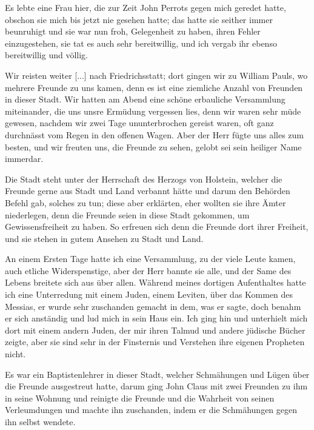 Es lebte eine Frau hier, die zur Zeit John Perrots gegen
mich geredet hatte, obschon sie mich bis jetzt nie gesehen hatte;
das hatte sie seither immer beunruhigt und sie war nun froh,
Gelegenheit zu haben, ihren Fehler einzugestehen, sie tat es auch
sehr bereitwillig, und ich vergab ihr ebenso bereitwillig und
völlig.

Wir reisten weiter [...] nach Friedrichsstatt; dort gingen
wir zu William Pauls, wo mehrere Freunde zu uns kamen,
denn es ist eine ziemliche Anzahl von Freunden in dieser Stadt.
Wir hatten am Abend eine schöne erbauliche Versammlung miteinander, 
die uns unsre Ermüdung vergessen lies, denn wir waren
sehr müde gewesen, nachdem wir zwei Tage ununterbrochen gereist 
waren, oft ganz durchnässt vom Regen in den offenen
Wagen. Aber der Herr fügte uns alles zum besten, und wir
freuten uns, die Freunde zu sehen, gelobt sei sein heiliger Name
immerdar.

Die Stadt steht unter der Herrschaft des Herzogs von 
Holstein, 
welcher die Freunde gerne aus Stadt und Land verbannt
hätte und darum den Behörden Befehl gab, solches zu tun; diese
aber erklärten, eher wollten sie ihre Ämter niederlegen, denn die
Freunde seien in diese Stadt gekommen, um Gewissensfreiheit zu
haben. So erfreuen sich denn die Freunde dort ihrer Freiheit,
und sie stehen in gutem Ansehen zu Stadt und Land.

An einem Ersten Tage hatte ich eine Versammlung, zu der
viele Leute kamen, auch etliche Widerspenstige, aber der Herr bannte
sie alle, und der Same des Lebens breitete sich aus über allen.
Während meines dortigen Aufenthaltes hatte ich eine Unterredung
mit einem Juden, einem Leviten, über das Kommen des Messias,
er wurde sehr zuschanden gemacht in dem, was er sagte, doch 
benahm er sich anständig und lud mich in sein Haus ein. Ich ging
hin und unterhielt mich dort mit einem andern Juden, der mir
ihren Talmud und andere jüdische Bücher zeigte, aber sie sind
sehr in der Finsternis und Verstehen ihre eigenen Propheten nicht.

Es war ein Baptistenlehrer in dieser Stadt, welcher 
Schmähungen und Lügen über die Freunde ausgestreut hatte, darum
ging John Claus mit zwei Freunden zu 
ihm in seine Wohnung und reinigte die Freunde und die Wahrheit von seinen 
Verleumdungen und machte ihn zuschanden, indem er die 
Schmähungen gegen ihn selbst wendete.

